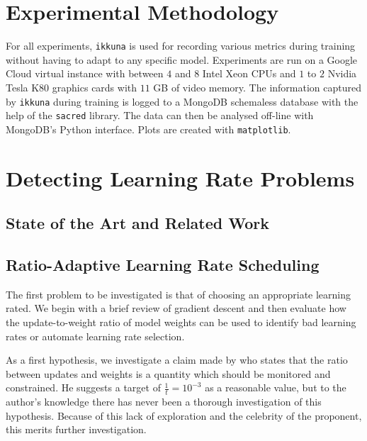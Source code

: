 \section{Experimental Methodology}%
\label{sec:experimental_methodology}

For all experiments, \texttt{ikkuna} is used for recording various metrics
during training without having to adapt to any specific model. Experiments are
run on a Google Cloud virtual instance with between $4$ and $8$ Intel Xeon CPUs
and $1$ to $2$  Nvidia Tesla K80 graphics cards with $11$ GB of video memory. The
information captured by \texttt{ikkuna} during training is logged to a MongoDB
schemaless database with the help of the \texttt{sacred} library. The data can
then be analysed off-line with MongoDB's Python interface. Plots are created
with \texttt{matplotlib}. %

\section{Detecting Learning Rate Problems}%
\label{sec:detecting_learning_rate_problems}

\subsection{State of the Art and Related Work}%

\subsection{Ratio-Adaptive Learning Rate Scheduling}%
\label{sub:ratio_adaptive_learning_rate_scheduling}

The first problem to be investigated is that of choosing an appropriate learning
rated. We begin with a brief review of gradient descent and then evaluate how
the update-to-weight ratio of model weights can be used to identify bad learning
rates or automate learning rate selection.

As a first hypothesis, we investigate a claim made by \citet{karpathycs231n} who
states that the ratio between updates and weights is a quantity which should be
monitored and constrained. He suggests a target of $\frac{1}{t} = 10^{-3}$ as a
reasonable value, but to the author's knowledge there has never been a thorough
investigation of this hypothesis. Because of this lack of exploration and the
celebrity of the proponent, this merits further investigation.

